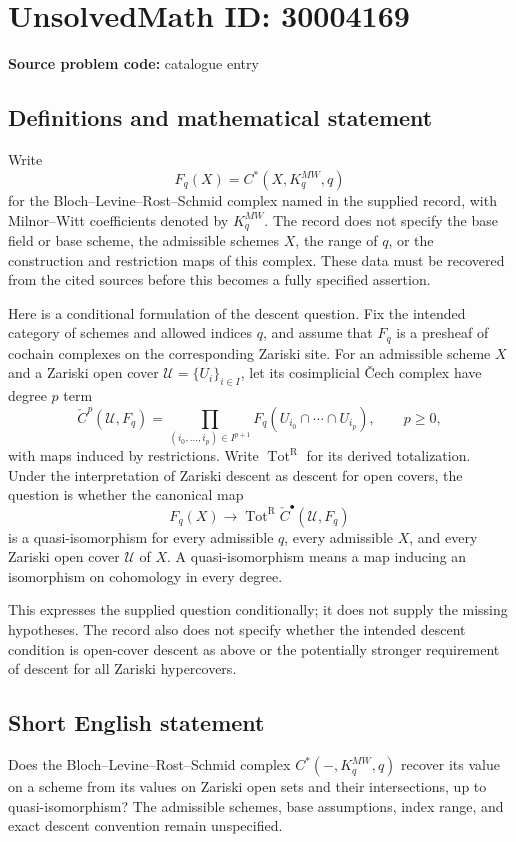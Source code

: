 \documentclass[11pt]{article}
\begin{document}
\section*{UnsolvedMath ID: 30004169}
\textbf{Source problem code:} catalogue entry
\subsection{Definitions and mathematical statement}
Write
\[
F_q(X)=C^*(X,K_q^{MW},q)
\]
for the Bloch--Levine--Rost--Schmid complex named in the supplied record, with Milnor--Witt coefficients denoted by \(K_q^{MW}\). The record does not specify the base field or base scheme, the admissible schemes \(X\), the range of \(q\), or the construction and restriction maps of this complex. These data must be recovered from the cited sources before this becomes a fully specified assertion.

Here is a conditional formulation of the descent question. Fix the intended category of schemes and allowed indices \(q\), and assume that \(F_q\) is a presheaf of cochain complexes on the corresponding Zariski site. For an admissible scheme \(X\) and a Zariski open cover \(\mathcal U=\{U_i\}_{i\in I}\), let its cosimplicial Čech complex have degree \(p\) term
\[
\check C^p(\mathcal U,F_q)
 =\prod_{(i_0,\ldots,i_p)\in I^{p+1}}
 F_q(U_{i_0}\cap\cdots\cap U_{i_p}),
 \qquad p\geq 0,
\]
with maps induced by restrictions. Write \(\operatorname{Tot}^{\mathrm R}\) for its derived totalization. Under the interpretation of Zariski descent as descent for open covers, the question is whether the canonical map
\[
F_q(X)\longrightarrow
\operatorname{Tot}^{\mathrm R}\check C^\bullet(\mathcal U,F_q)
\]
is a quasi-isomorphism for every admissible \(q\), every admissible \(X\), and every Zariski open cover \(\mathcal U\) of \(X\). A quasi-isomorphism means a map inducing an isomorphism on cohomology in every degree.

This expresses the supplied question conditionally; it does not supply the missing hypotheses. The record also does not specify whether the intended descent condition is open-cover descent as above or the potentially stronger requirement of descent for all Zariski hypercovers.
\subsection{Short English statement}
Does the Bloch--Levine--Rost--Schmid complex \(C^*(-,K_q^{MW},q)\) recover its value on a scheme from its values on Zariski open sets and their intersections, up to quasi-isomorphism? The admissible schemes, base assumptions, index range, and exact descent convention remain unspecified.
\end{document}
